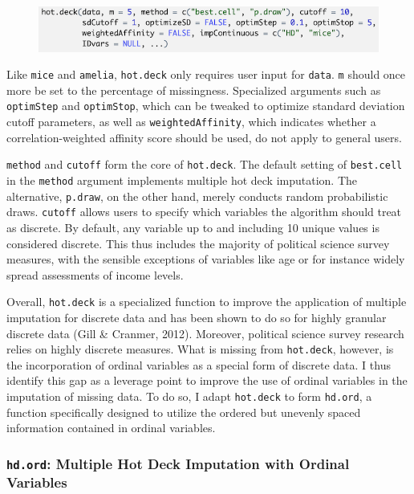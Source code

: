 \documentclass[12pt,econ]{sources/authesis}
\makeatletter
\def\maxwidth{\ifdim\Gin@nat@width>\linewidth\linewidth
\else\Gin@nat@width\fi}
\let\Oldincludegraphics\includegraphics
\renewcommand{\includegraphics}[1]{\Oldincludegraphics[width=\maxwidth]{#1}}
\def\caption{\refstepcounter\@captype \@dblarg{\@caption\@captype}}
\makeatother
\begin{document}
\vspace{0.5cm}
\begin{figure}[!htbp] 
  \centering
  \includegraphics{figures/hot.deck.png}
  \caption{The \texttt{hot.deck} Function}
  \label{hot.deck-func}
\end{figure}
\vspace{-0.5cm}

Like \texttt{mice} and \texttt{amelia}, \texttt{hot.deck} only requires user input for \texttt{data}. \texttt{m} should once more be set to the percentage of missingness. Specialized arguments such as \texttt{optimStep} and \texttt{optimStop}, which can be tweaked to optimize standard deviation cutoff parameters, as well as \texttt{weightedAffinity}, which indicates whether a correlation-weighted affinity score should be used, do not apply to general users.

\texttt{method} and \texttt{cutoff} form the core of \texttt{hot.deck}. The default setting of \texttt{best.cell} in the \texttt{method} argument implements multiple hot deck imputation. The alternative, \texttt{p.draw}, on the other hand, merely conducts random probabilistic draws. \texttt{cutoff} allows users to specify which variables the algorithm should treat as discrete. By default, any variable up to and including 10 unique values is considered discrete. This thus includes the majority of political science survey measures, with the sensible exceptions of variables like age or for instance widely spread assessments of income levels.

Overall, \texttt{hot.deck} is a specialized function to improve the application of multiple imputation for discrete data and has been shown to do so for highly granular discrete data (Gill \& Cranmer, 2012). Moreover, political science survey research relies on highly discrete measures. What is missing from \texttt{hot.deck}, however, is the incorporation of ordinal variables as a special form of discrete data. I thus identify this gap as a leverage point to improve the use of ordinal variables in the imputation of missing data. To do so, I adapt \texttt{hot.deck} to form \texttt{hd.ord}, a function specifically designed to utilize the ordered but unevenly spaced information contained in ordinal variables.

\hypertarget{ordmiss-theory-multimpute-hdord}{%
\subsubsection{\texorpdfstring{\texttt{hd.ord}: Multiple Hot Deck Imputation with Ordinal Variables}{hd.ord: Multiple Hot Deck Imputation with Ordinal Variables}}\label{ordmiss-theory-multimpute-hdord}}
\end{document}
